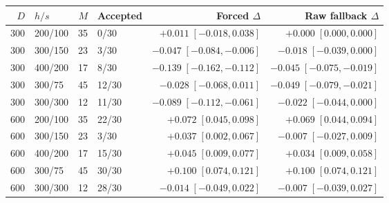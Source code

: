 \begin{tabular}{rlrlrr}
\toprule
$D$ & $h/s$ & $M$ & Accepted & Forced $\Delta$ & Raw fallback $\Delta$ \\
\midrule
300 & 200/100 & 35 & 0/30 & $+0.011\;[-0.018,0.038]$ & $+0.000\;[0.000,0.000]$ \\
300 & 300/150 & 23 & 3/30 & $-0.047\;[-0.084,-0.006]$ & $-0.018\;[-0.039,0.000]$ \\
300 & 400/200 & 17 & 8/30 & $-0.139\;[-0.162,-0.112]$ & $-0.045\;[-0.075,-0.019]$ \\
300 & 300/75 & 45 & 12/30 & $-0.028\;[-0.068,0.011]$ & $-0.049\;[-0.079,-0.021]$ \\
300 & 300/300 & 12 & 11/30 & $-0.089\;[-0.112,-0.061]$ & $-0.022\;[-0.044,0.000]$ \\
600 & 200/100 & 35 & 22/30 & $+0.072\;[0.045,0.098]$ & $+0.069\;[0.044,0.094]$ \\
600 & 300/150 & 23 & 3/30 & $+0.037\;[0.002,0.067]$ & $-0.007\;[-0.027,0.009]$ \\
600 & 400/200 & 17 & 15/30 & $+0.045\;[0.009,0.077]$ & $+0.034\;[0.009,0.058]$ \\
600 & 300/75 & 45 & 30/30 & $+0.100\;[0.074,0.121]$ & $+0.100\;[0.074,0.121]$ \\
600 & 300/300 & 12 & 28/30 & $-0.014\;[-0.049,0.022]$ & $-0.007\;[-0.039,0.027]$ \\
\bottomrule
\end{tabular}
